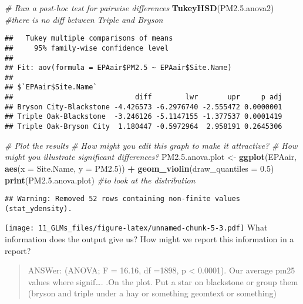 \documentclass[]{article}
\newenvironment{Shaded}{\begin{snugshade}}{\end{snugshade}}
\newcommand{\KeywordTok}[1]{\textcolor[rgb]{0.13,0.29,0.53}{\textbf{#1}}}
\newcommand{\DataTypeTok}[1]{\textcolor[rgb]{0.13,0.29,0.53}{#1}}
\newcommand{\DecValTok}[1]{\textcolor[rgb]{0.00,0.00,0.81}{#1}}
\newcommand{\FloatTok}[1]{\textcolor[rgb]{0.00,0.00,0.81}{#1}}
\newcommand{\StringTok}[1]{\textcolor[rgb]{0.31,0.60,0.02}{#1}}
\newcommand{\CommentTok}[1]{\textcolor[rgb]{0.56,0.35,0.01}{\textit{#1}}}
\newcommand{\OperatorTok}[1]{\textcolor[rgb]{0.81,0.36,0.00}{\textbf{#1}}}
\newcommand{\NormalTok}[1]{#1}
\begin{document}
\begin{Shaded}
\begin{Highlighting}[]
\CommentTok{# Run a post-hoc test for pairwise differences}
\KeywordTok{TukeyHSD}\NormalTok{(PM2.}\FloatTok{5.}\NormalTok{anova2) }\CommentTok{#there is no diff between Triple and Bryson}
\end{Highlighting}
\end{Shaded}

\begin{verbatim}
##   Tukey multiple comparisons of means
##     95% family-wise confidence level
## 
## Fit: aov(formula = EPAair$PM2.5 ~ EPAair$Site.Name)
## 
## $`EPAair$Site.Name`
##                             diff        lwr       upr     p adj
## Bryson City-Blackstone -4.426573 -6.2976740 -2.555472 0.0000001
## Triple Oak-Blackstone  -3.246126 -5.1147155 -1.377537 0.0001419
## Triple Oak-Bryson City  1.180447 -0.5972964  2.958191 0.2645306
\end{verbatim}

\begin{Shaded}
\begin{Highlighting}[]
\CommentTok{# Plot the results}
\CommentTok{# How might you edit this graph to make it attractive?}
\CommentTok{# How might you illustrate significant differences?}
\NormalTok{PM2.}\FloatTok{5.}\NormalTok{anova.plot <-}\StringTok{ }\KeywordTok{ggplot}\NormalTok{(EPAair, }\KeywordTok{aes}\NormalTok{(}\DataTypeTok{x =}\NormalTok{ Site.Name, }\DataTypeTok{y =}\NormalTok{ PM2.}\DecValTok{5}\NormalTok{)) }\OperatorTok{+}
\StringTok{  }\KeywordTok{geom_violin}\NormalTok{(}\DataTypeTok{draw_quantiles =} \FloatTok{0.5}\NormalTok{)}
\KeywordTok{print}\NormalTok{(PM2.}\FloatTok{5.}\NormalTok{anova.plot) }\CommentTok{#to look at the distribution}
\end{Highlighting}
\end{Shaded}

\begin{verbatim}
## Warning: Removed 52 rows containing non-finite values (stat_ydensity).
\end{verbatim}

\texttt{[image: 11\_GLMs\_files/figure-latex/unnamed-chunk-5-3.pdf]} What
information does the output give us? How might we report this
information in a report?

\begin{quote}
ANSWer: (ANOVA; F = 16.16, df =1898, p \textless{} 0.0001). Our average
pm25 values where signif\ldots{}. .On the plot. Put a star on blackstone
or group them (bryson and triple under a hay or something geomtext or
something)
\end{quote}
\end{document}
